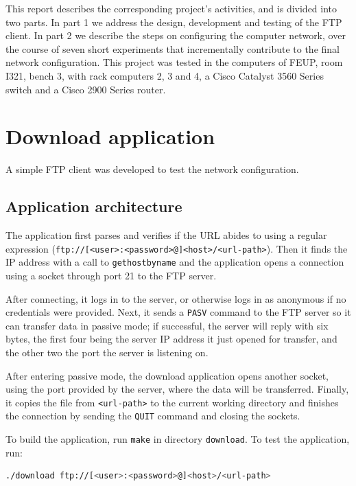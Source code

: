 \documentclass[a4paper, 11pt]{report}
\begin{document}
This report describes the corresponding project's activities, and is divided into two parts.
In part 1 we address the design, development and testing of the FTP client.
In part 2 we describe the steps on configuring the computer network, over the course of seven short experiments that incrementally contribute to the final network configuration.
This project was tested in the computers of FEUP, room I321, bench 3, with rack computers 2, 3 and 4, a Cisco Catalyst 3560 Series switch and a Cisco 2900 Series router.

\section{Download application} \label{sec:Part1}

A simple FTP client was developed to test the network configuration.

\subsection{Application architecture} \label{sec:Arc}

The application first parses and verifies if the URL abides to \cite{rfc1738} using a regular expression (\texttt{ftp://[<user>:<password>@]<host>/<url-path>}).
Then it finds the IP address with a call to \texttt{gethostbyname} and the application opens a connection using a socket through port 21 to the FTP server. 

After connecting, it logs in to the server, or otherwise logs in as anonymous if no credentials were provided.
Next, it sends a \texttt{PASV} command to the FTP server so it can transfer data in passive mode; if successful, the server will reply
with six bytes, the first four being the server IP address it just opened for transfer, and the other two the port the server is listening on. 

After entering passive mode, the download application opens another socket, using the port provided by the server, where the data will be transferred.
Finally, it copies the file from \texttt{<url-path>} to the current working directory and finishes the connection by sending the \texttt{QUIT} command and closing the sockets.

To build the application, run \texttt{make} in directory \texttt{download}. To test the application, run:

\begin{lstlisting}[frame=none, numbers=none, language=sh]
./download ftp://[<user>:<password>@]<host>/<url-path>
\end{lstlisting}
\end{document}
